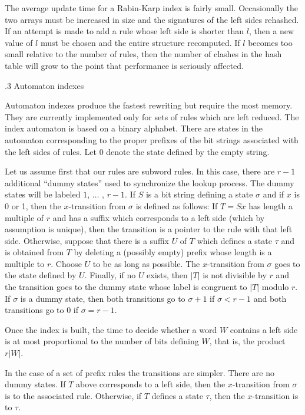 The average update time for a Rabin-Karp index is fairly small.
Occasionally the two arrays must be increased in size and the
signatures of the left sides rehashed. If an attempt is made to add a
rule whose left side is shorter than $l$, then a new value of $l$ must
be chosen and the entire structure recomputed.  If $l$ becomes too
small relative to the number of rules, then the number of clashes in
the hash table will grow to the point that performance is seriously
affected.

\bigskip
{}.3 Automaton indexes

\nobreak

Automaton indexes produce the fastest rewriting but require the most
memory. They are currently implemented only for sets of rules which
are left reduced.  The index automaton is based on a binary alphabet.
There are states in the automaton corresponding to the proper prefixes
of the bit strings associated with the left sides of rules.  Let $0$
denote the state defined by the empty string.

Let us assume first that our rules are subword rules.  In this case,
there are $r-1$ additional ``dummy states'' used to synchronize the
lookup process.  The dummy states will be labeled $1$, $\ldots$ , $r-1$.
If $S$ is a bit string defining a state $\sigma$ and if $x$ is 0 or 1,
then the $x$-transition from $\sigma$ is defined as follows: If $T =
Sx$ has length a multiple of $r$ and has a suffix which corresponds to
a left side (which by assumption is unique), then the transition is a
pointer to the rule with that left side.  Otherwise, suppose that
there is a suffix $U$ of $T$ which defines a state $\tau$ and is
obtained from $T$ by deleting a (possibly empty) prefix whose length
is a multiple to $r$.  Choose $U$ to be as long as possible.  The
$x$-transition from $\sigma$ goes to the state defined by $U$.
Finally, if no $U$ exists, then $|T|$ is not divisible by $r$ and the
transition goes to the dummy state whose label is congruent to $|T|$
modulo $r$.
If $\sigma$ is a dummy state, then both transitions go to $\sigma+1$
if $\sigma<r-1$ and both transitions go to $0$ if $\sigma=r-1$.

Once the index is built, the time to decide whether a word $W$
contains a left side is at most proportional to the number of bits
defining $W$, that is, the product $r|W|$.

In the case of a set of prefix rules the transitions are simpler.
There are no dummy states.  If $T$ above corresponds to a left side,
then the $x$-transition from $\sigma$ is to the associated rule.
Otherwise, if $T$ defines a state $\tau$, then the $x$-transition is
to $\tau$.

